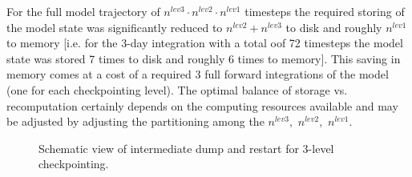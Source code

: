 For the full model trajectory of
$ n^{lev3} \cdot n^{lev2} \cdot n^{lev1} $ timesteps
the required storing of the model state was significantly reduced to
$ n^{lev2} + n^{lev3} $ to disk and roughly $ n^{lev1} $ to memory
[i.e. for the 3-day integration with a total oof 72 timesteps
the model state was stored 7 times to disk and roughly 6 times
to memory].
This saving in memory comes at a cost of a required
3 full forward integrations of the model (one for each
checkpointing level).
The optimal balance of storage vs. recomputation certainly depends
on the computing resources available and may be adjusted by
adjusting the partitioning among the 
$ n^{lev3}, \,\, n^{lev2}, \,\, n^{lev1} $.

\begin{figure}[t!]
\begin{center}
\end{center}
\caption{
Schematic view of intermediate dump and restart for 
3-level checkpointing.}
\label{fig:3levelcheck}
\end{figure}

